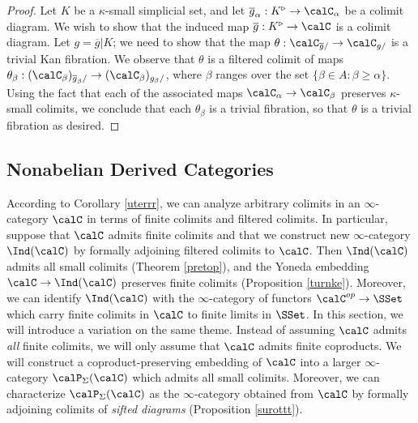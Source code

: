 \begin{proof}
Let $K$ be a $\kappa$-small simplicial set, and let $\overline{g}_{\alpha}: K^{\triangleright} \rightarrow \calC_{\alpha}$ be a colimit diagram. We wish to show that the induced map 
$\overline{g}: K^{\triangleright} \rightarrow \calC$ is a colimit diagram. Let
$g = \overline{g} |K$; we need to show that the map $\theta: \calC_{\overline{g}/} \rightarrow \calC_{g/}$ is a trivial Kan fibration. We observe that $\theta$ is a filtered colimit of maps
$\theta_{\beta}: (\calC_{\beta})_{\overline{g}_{\beta}/} \rightarrow (\calC_{\beta})_{g_{\beta}/}$, where $\beta$ ranges over the set $\{ \beta \in A : \beta \geq \alpha \}$. Using the fact that each of the associated maps $\calC_{\alpha} \rightarrow \calC_{\beta}$ preserves $\kappa$-small colimits, we conclude that each $\theta_{\beta}$ is a trivial fibration, so that $\theta$ is a trivial fibration as desired.
\end{proof}

\subsection{Nonabelian Derived Categories}\label{stable11}

According to Corollary \ref{uterrr}, we can analyze arbitrary colimits in an $\infty$-category $\calC$ in terms of finite colimits and filtered colimits. In particular, suppose that $\calC$ admits finite colimits and that we construct new $\infty$-category $\Ind(\calC)$ by formally adjoining filtered colimits to $\calC$. Then $\Ind(\calC)$ admits all small colimits (Theorem \ref{pretop}), and the Yoneda embedding $\calC \rightarrow \Ind(\calC)$ preserves finite colimits (Proposition \ref{turnke}). 
Moreover, we can identify $\Ind(\calC)$ with the $\infty$-category of functors $\calC^{op} \rightarrow \SSet$ which carry finite colimits in $\calC$ to finite limits in $\SSet$. In this section, we will introduce a variation on the same theme. Instead of assuming $\calC$ admits {\em all} finite colimits, we will only assume that $\calC$ admits finite coproducts. We will construct a coproduct-preserving embedding of $\calC$ into a larger $\infty$-category $\calP_{\Sigma}(\calC)$ which admits all small colimits. Moreover, we can characterize $\calP_{\Sigma}(\calC)$ as the $\infty$-category obtained from $\calC$ by formally adjoining colimits of {\em sifted diagrams} (Proposition \ref{surottt}). 

